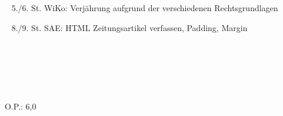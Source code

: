 {{	\textbullet~ 5./6. St. WiKo: Verjährung aufgrund der verschiedenen Rechtsgrundlagen\par
	\textbullet~ 8./9. St. SAE: HTML Zeitungsartikel verfassen, Padding, Margin\par
	\textbullet~ \par
	\textbullet~ \par
	\textbullet~ 
	}{}{O.P.: 6,0}
}{}
\Unterschrift
\newpage
